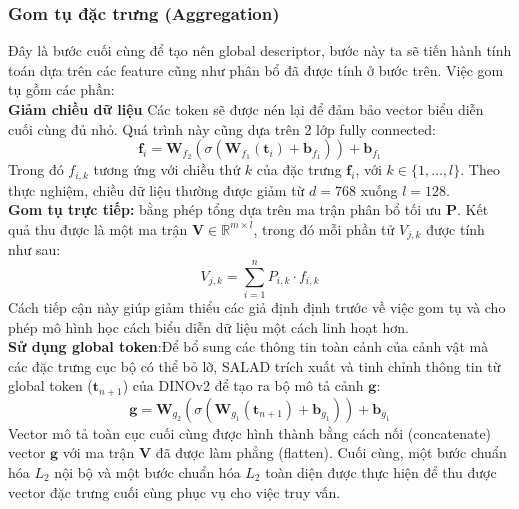 \documentclass[12pt,a4paper]{article}
\begin{document}
    \subsubsection{Gom tụ đặc trưng (Aggregation)}
    
    Đây là bước cuối cùng để tạo nên global descriptor, bước này ta sẽ tiến hành tính toán dựa trên các feature cũng như phân bổ đã được tính ở bước trên. Việc gom tụ gồm các phần:\\
    
    \textbf{Giảm chiều dữ liệu} Các token sẽ được nén lại để đảm bảo vector biểu diễn cuối cùng đủ nhỏ. Quá trình này cũng dựa trên 2 lớp fully connected:
    \begin{equation}
    \mathbf{f}_i = \mathbf{W}_{f_2}(\sigma(\mathbf{W}_{f_1}(\mathbf{t}_i) + \mathbf{b}_{f_1})) + \mathbf{b}_{f_1}
    \label{eq:dim_reduction}
    \end{equation}
    Trong đó $f_{i,k}$ tương ứng với chiều thứ $k$ của đặc trưng $\mathbf{f}_i$, với $k \in \{1, \dots, l\}$. Theo thực nghiệm, chiều dữ liệu thường được giảm từ $d=768$ xuống $l=128$.
    \\
    
     \textbf{Gom tụ trực tiếp:} bằng phép tổng dựa trên ma trận phân bổ tối ưu $\mathbf{P}$. Kết quả thu được là một ma trận $\mathbf{V} \in \mathbb{R}^{m \times l}$, trong đó mỗi phần tử $V_{j,k}$ được tính như sau:
    \begin{equation}
    V_{j,k} = \sum_{i=1}^n P_{i,k} \cdot f_{i,k}
    \label{eq:aggregation_sum}
    \end{equation}
    Cách tiếp cận này giúp giảm thiểu các giả định định trước về việc gom tụ và cho phép mô hình học cách biểu diễn dữ liệu một cách linh hoạt hơn. \\
    
    
    \textbf{Sử dụng global token}:Để bổ sung các thông tin toàn cảnh của cảnh vật mà các đặc trưng cục bộ có thể bỏ lỡ, SALAD trích xuất và tinh chỉnh thông tin từ global token ($\mathbf{t}_{n+1}$) của DINOv2 để tạo ra bộ mô tả cảnh $\mathbf{g}$:
    \begin{equation}
    \mathbf{g} = \mathbf{W}_{g_2}(\sigma(\mathbf{W}_{g_1}(\mathbf{t}_{n+1}) + \mathbf{b}_{g_1})) + \mathbf{b}_{g_1}
    \label{eq:global_token}
    \end{equation}
    Vector mô tả toàn cục cuối cùng được hình thành bằng cách nối (concatenate) vector $\mathbf{g}$ với ma trận $\mathbf{V}$ đã được làm phẳng (flatten). Cuối cùng, một bước chuẩn hóa $L_2$ nội bộ và một bước chuẩn hóa $L_2$ toàn diện được thực hiện để thu được vector đặc trưng cuối cùng phục vụ cho việc truy vấn.
\end{document}

